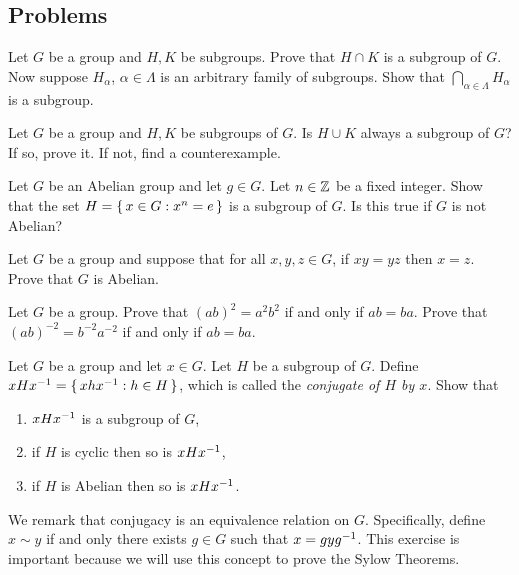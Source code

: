 \documentclass[./main.tex]{subfiles}
\begin{document}
\subsection{Problems}

\begin{exercise}
    Let $G$ be a group and $H, K$ be subgroups. Prove that $H \cap K$ is a
    subgroup of $G$. Now suppose $H_{\alpha}$, $\alpha \in \Lambda$ is an
    arbitrary family of subgroups. Show that $\bigcap_{\alpha \in \Lambda}
    H_\alpha$ is a subgroup.
\end{exercise}

\begin{exercise}
    Let $G$ be a group and $H, K$ be subgroups of $G$. Is $H \cup K$ always a
    subgroup of $G$? If so, prove it. If not, find a counterexample.
\end{exercise}

\begin{exercise}
    Let $G$ be an Abelian group and let $g \in G$. Let $n \in \mathbb{Z}$ be a fixed
    integer. Show that the set $H = \set{x \in G: x^n = e}$ is a subgroup of
    $G$. Is this true if $G$ is not Abelian?
\end{exercise}

\begin{exercise}
    Let $G$ be a group and suppose that for all $x,y,z \in G$, if $xy=yz$ then
    $x=z$. Prove that $G$ is Abelian.
\end{exercise}

\begin{exercise}
    Let $G$ be a group. Prove that $(ab)^2 = a^2 b^2$ if and only if $ab=ba$.
    Prove that $(ab)^{-2} = b^{-2} a^{-2}$ if and only if $ab=ba$.
    \autocite[Ex.~36, Ch~1, \pno~56]{Gallian_2020}
\end{exercise}

\begin{exercise}[Conjugates]
    Let $G$ be a group and let $x \in G$. Let $H$ be a subgroup of $G$. 
    Define $xHx^{-1} = \set{xhx^{-1}: h \in H}$, which is called the \emph{conjugate of $H$ by $x$}.
    Show that 
    \begin{enumerate}
        \item $xHx^{-1}$ is a subgroup of $G$,
        \item if $H$ is cyclic then so is $xHx^{-1}$,
        \item if $H$ is Abelian then so is $xHx^{-1}$.
    \end{enumerate}
    
    We remark that conjugacy is an equivalence relation on $G$. Specifically,
    define $x \sim y$ if and only there exists $g \in G$ such that $x =
    gyg^{-1}$. This exercise is important because we will use this concept to
    prove the Sylow Theorems.
\end{exercise}
\end{document}
